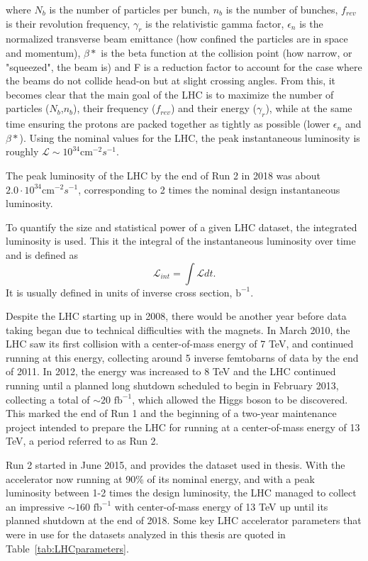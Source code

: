 where $N_b$ is the number of particles per bunch, $n_b$ is the number of bunches, $f_{rev}$ is their revolution frequency, $\gamma_r$ is the relativistic gamma factor, $\epsilon_n$ is the normalized transverse beam emittance (how confined the particles are in space and momentum), $\beta *$ is the beta function at the collision point (how narrow, or "squeezed", the beam is) and F is a reduction factor to account for the case where the beams do not collide head-on but at slight crossing angles.
From this, it becomes clear that the main goal of the LHC is to maximize the number of particles ($N_b$,$n_b$), their frequency ($f_{rev}$) and their energy ($\gamma_r$), while at the same time ensuring the protons are packed together as tightly as possible (lower $\epsilon_n$ and $\beta *$).
Using the nominal values for the LHC, the peak instantaneous luminosity is roughly $\mathcal L \sim 10^{34} \textrm{cm}^{-2} s^{-1}$. 


The peak luminosity of the LHC by the end of Run 2 in 2018 was about $2.0 \cdot 10^{34} \textrm{cm}^{-2} s^{-1}$, corresponding to 2 times the nominal design instantaneous luminosity.

To quantify the size and statistical power of a given LHC dataset, the integrated luminosity is used. This it the integral of the instantaneous luminosity over time and is defined as
\begin{equation}
  \mathcal L_{int} = \int \mathcal L dt.
\end{equation}
It is usually defined in units of inverse cross section, $\textrm{b}^{-1}$.


Despite the LHC starting up in 2008, there would be another year before data taking began due to technical difficulties with the magnets. In March 2010, the LHC saw its first collision with a center-of-mass energy of 7 TeV, and continued running at this energy, collecting around 5 inverse femtobarns of data by the end of 2011. In 2012, the energy was increased to 8 TeV and the LHC continued running until a planned long shutdown scheduled to begin in February 2013, collecting a total of $\sim 20 \textrm{ fb}^{-1}$, which allowed the Higgs boson to be discovered. This marked the end of Run 1 and the beginning of a two-year maintenance project intended to prepare the LHC for running at a center-of-mass energy of 13 TeV, a period referred to as Run 2.

Run 2 started in June 2015, and provides the dataset used in thesis. With the accelerator now running at 90\% of its nominal energy, and with a peak luminosity between 1-2 times the design luminosity, the LHC managed to collect an impressive $\sim 160 \textrm{ fb}^{-1}$ with center-of-mass energy of 13 TeV up until its planned shutdown at the end of 2018. Some key LHC accelerator parameters that were in use for the datasets analyzed in this thesis are quoted in Table~\ref{tab:LHCparameters}.

